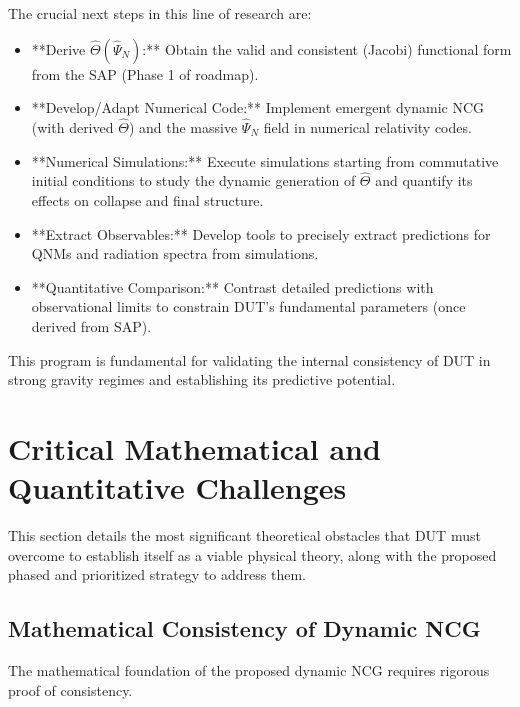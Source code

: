 \documentclass[11pt, a4paper]{article}
\theoremstyle{remark}
\newcommand{\Op}[1]{\hat{#1}}
\begin{document}
The crucial next steps in this line of research are:
\begin{itemize}
    \item **Derive \( \Op{\Theta}(\Op{\Psi}_N) \):** Obtain the valid and consistent (Jacobi) functional form from the SAP (Phase 1 of roadmap).
    \item **Develop/Adapt Numerical Code:** Implement emergent dynamic NCG (with derived \( \Op{\Theta} \)) and the massive \( \Op{\Psi}_N \) field in numerical relativity codes.
    \item **Numerical Simulations:** Execute simulations starting from commutative initial conditions to study the dynamic generation of \( \Op{\Theta} \) and quantify its effects on collapse and final structure.
    \item **Extract Observables:** Develop tools to precisely extract predictions for QNMs and radiation spectra from simulations.
    \item **Quantitative Comparison:** Contrast detailed predictions with observational limits to constrain DUT's fundamental parameters (once derived from SAP).
\end{itemize}
This program is fundamental for validating the internal consistency of DUT in strong gravity regimes and establishing its predictive potential.

\section{Critical Mathematical and Quantitative Challenges}
\label{sec:challenges_detailed}

This section details the most significant theoretical obstacles that DUT must overcome to establish itself as a viable physical theory, along with the proposed phased and prioritized strategy to address them.

\subsection{Mathematical Consistency of Dynamic NCG}
\label{subsec:math_consistency_detailed}

The mathematical foundation of the proposed dynamic NCG requires rigorous proof of consistency.
\end{document}
